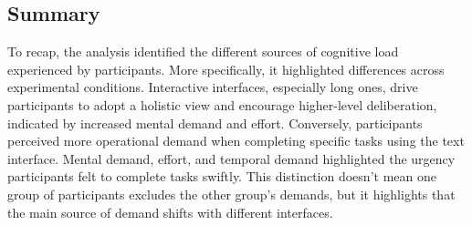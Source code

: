 \subsection{Summary}
To recap, the analysis identified the different sources of cognitive load experienced by participants. More specifically, it highlighted differences across experimental conditions. Interactive interfaces, especially long ones, drive participants to adopt a holistic view and encourage higher-level deliberation, indicated by increased mental demand and effort. Conversely, participants perceived more operational demand when completing specific tasks using the text interface. Mental demand, effort, and temporal demand highlighted the urgency participants felt to complete tasks swiftly. This distinction doesn't mean one group of participants excludes the other group's demands, but it highlights that the main source of demand shifts with different interfaces.




